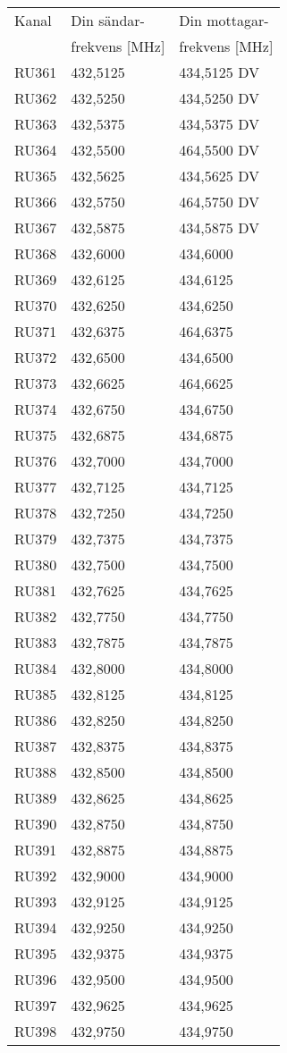 \begin{tabular}{ l | l | l }
  Kanal & Din sändar- & Din mottagar- \\
        & frekvens [MHz] & frekvens [MHz] \\
  \hline
 RU361 & 432,5125 & 434,5125 DV\\
 RU362 & 432,5250 & 434,5250 DV\\
 RU363 & 432,5375 & 434,5375 DV\\
 RU364 & 432,5500 & 464,5500 DV\\
 RU365 & 432,5625 & 434,5625 DV\\
 RU366 & 432,5750 & 464,5750 DV\\
 RU367 & 432,5875 & 434,5875 DV\\
 RU368 & 432,6000 & 434,6000\\
 RU369 & 432,6125 & 434,6125\\
 RU370 & 432,6250 & 434,6250\\
 RU371 & 432,6375 & 464,6375\\
 RU372 & 432,6500 & 434,6500\\
 RU373 & 432,6625 & 464,6625\\
 RU374 & 432,6750 & 434,6750\\
 RU375 & 432,6875 & 434,6875\\
 RU376 & 432,7000 & 434,7000\\
 RU377 & 432,7125 & 434,7125\\
 RU378 & 432,7250 & 434,7250\\
 RU379 & 432,7375 & 434,7375\\
 RU380 & 432,7500 & 434,7500\\
 RU381 & 432,7625 & 434,7625\\
 RU382 & 432,7750 & 434,7750\\
 RU383 & 432,7875 & 434,7875\\
 RU384 & 432,8000 & 434,8000\\
 RU385 & 432,8125 & 434,8125\\
 RU386 & 432,8250 & 434,8250\\
 RU387 & 432,8375 & 434,8375\\
 RU388 & 432,8500 & 434,8500\\
 RU389 & 432,8625 & 434,8625\\
 RU390 & 432,8750 & 434,8750\\
 RU391 & 432,8875 & 434,8875\\
 RU392 & 432,9000 & 434,9000\\
 RU393 & 432,9125 & 434,9125\\
 RU394 & 432,9250 & 434,9250\\
 RU395 & 432,9375 & 434,9375\\
 RU396 & 432,9500 & 434,9500\\
 RU397 & 432,9625 & 434,9625\\
 RU398 & 432,9750 & 434,9750\\
\end{tabular}

